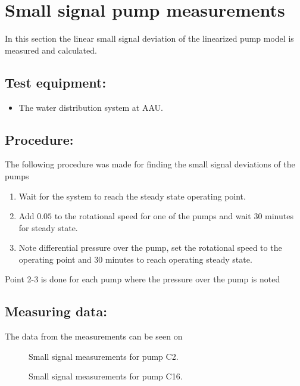 \section{Small signal pump measurements}
\label{sec:small_sig_pump}

In this section the linear small signal deviation of the linearized pump model is measured and calculated.


\subsection*{Test equipment:}
\begin{itemize}
\item The water distribution system at AAU.
\end{itemize}

\subsection*{Procedure:}
The following procedure was made for finding the small signal deviations of the pumps
\begin{enumerate}
\item Wait for the system to reach the steady state operating point.
\item Add $0.05$ to the rotational speed for one of the pumps and wait 30 minutes for steady state.
\item Note differential pressure over the pump, set the rotational speed to the operating point and 30 minutes to reach operating steady state. 
\end{enumerate}
Point 2-3 is done for each pump where the pressure over the pump is noted 

\subsection*{Measuring data:}
The data from the measurements can be seen on 

\begin{figure}[H]

\caption{Small signal measurements for pump C2.}
\label{fig:small_sig_diff_press_C2}
\end{figure}

\begin{figure}[H]

\caption{Small signal measurements for pump C16.}
\label{fig:small_sig_diff_press_C16}
\end{figure}

